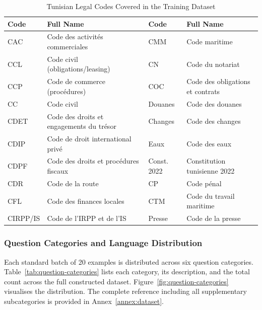 \begin{table}[H]
\centering
\caption{Tunisian Legal Codes Covered in the Training Dataset}
\label{tab:codes-covered}
\renewcommand{\arraystretch}{1.3}
\begin{tabular}{|p{2cm}|p{5.8cm}|p{2cm}|p{5.8cm}|}
\hline
\textbf{Code} & \textbf{Full Name} & \textbf{Code} & \textbf{Full Name} \\
\hline
CAC & Code des activités commerciales & CMM & Code maritime \\
\hline
CCL & Code civil (obligations/leasing) & CN & Code du notariat \\
\hline
CCP & Code de commerce (procédures) & COC & Code des obligations et contrats \\
\hline
CC & Code civil & Douanes & Code des douanes \\
\hline
CDET & Code des droits et engagements du trésor & Changes & Code des changes \\
\hline
CDIP & Code de droit international privé & Eaux & Code des eaux \\
\hline
CDPF & Code des droits et procédures fiscaux & Const. 2022 & Constitution tunisienne 2022 \\
\hline
CDR & Code de la route & CP & Code pénal \\
\hline
CFL & Code des finances locales & CTM & Code du travail maritime \\
\hline
CIRPP/IS & Code de l'IRPP et de l'IS & Presse & Code de la presse \\
\hline
\end{tabular}
\end{table}

\subsubsection{Question Categories and Language Distribution}

Each standard batch of 20 examples is distributed across six question categories. Table~\ref{tab:question-categories} lists each category, its description, and the total count across the full constructed dataset. Figure~\ref{fig:question-categories} visualises the distribution. The complete reference including all supplementary subcategories is provided in Annex~\ref{annex:dataset}.

